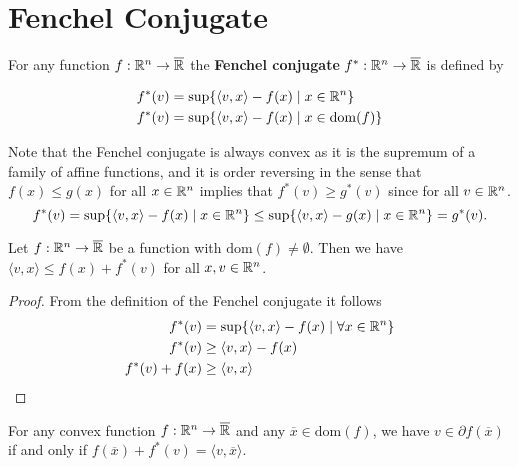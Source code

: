 \chapter{Fenchel Conjugate}

\begin{definition}
For any function $f: \Bbb R^n \rightarrow \overline{\Bbb R}$ the \textbf{Fenchel conjugate} $f^*: \Bbb R^n \rightarrow \overline{\Bbb R}$ is defined by

\begin{align*}
f^*(v) &= \mathrm{sup}\{\langle v, x \rangle - f(x) \mid x \in \Bbb R^n \} \\
f^*(v) &= \mathrm{sup}\{\langle v, x \rangle - f(x) \mid x \in \mathrm{dom}(f) \}
\end{align*}

Note that the Fenchel conjugate is always convex as it is the supremum of a family of affine functions, and it is order reversing in the sense that $f(x) \leq g(x)$ for all $x \in \Bbb R^n$ implies that $f^*(v) \geq g^*(v)$ since for all $v \in \Bbb R^n$.
\begin{equation*}
f^*(v) = \mathrm{sup}\{\langle v, x \rangle - f(x) \mid x \in \Bbb R^n \} \leq \mathrm{sup}\{\langle v, x \rangle - g(x) \mid x \in \Bbb R^n \} = g^*(v).
\end{equation*}

\begin{lemma}
Let $f: \Bbb R^n \rightarrow \overline{\Bbb R}$ be a function with $\mathrm{dom}(f) \neq \emptyset$. Then we have $\langle v, x \rangle \leq f(x) + f^*(v)$ for all $x, v \in \Bbb R^n$.
\end{lemma}

\begin{proof}
From the definition of the Fenchel conjugate it follows
\begin{align*}
f^*(v) &= \mathrm{sup}\{ \langle v, x \rangle - f(x) \mid \forall x \in \Bbb R^n \}
 \\
f^*(v) &\geq \langle v, x \rangle - f(x) \\
f^*(v) + f(x) &\geq \langle v, x \rangle
\end{align*}

\end{proof}

\begin{theorem}
For any convex function $f: \Bbb R^n \rightarrow \overline{\Bbb R}$ and any $\overline{x} \in \mathrm{dom}(f)$, we have $v \in \partial f(\overline{x})$ if and only if $f(\overline{x}) + f^*(v) = \langle v, \overline{x} \rangle$.
\end{theorem}


\end{definition}
